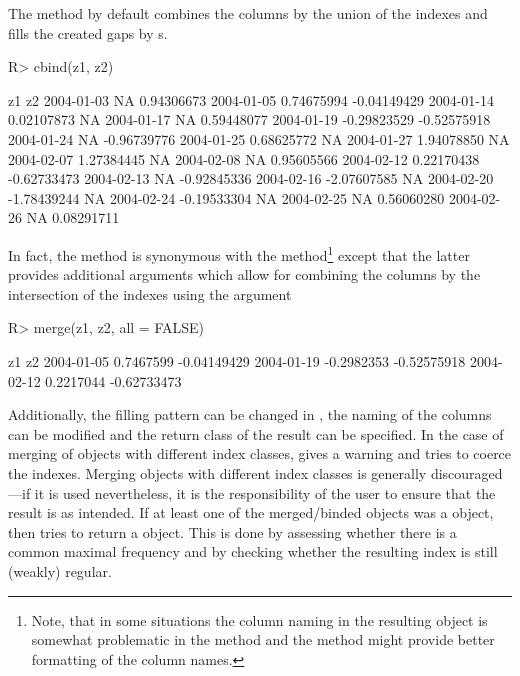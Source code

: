 \documentclass[article,nojss]{jss}
\begin{document}
The  method by default combines the columns by the union of
the indexes and fills the created gaps by s.
\begin{Schunk}
\begin{Sinput}
R> cbind(z1, z2)
\end{Sinput}
\begin{Soutput}
                    z1          z2
2004-01-03          NA  0.94306673
2004-01-05  0.74675994 -0.04149429
2004-01-14  0.02107873          NA
2004-01-17          NA  0.59448077
2004-01-19 -0.29823529 -0.52575918
2004-01-24          NA -0.96739776
2004-01-25  0.68625772          NA
2004-01-27  1.94078850          NA
2004-02-07  1.27384445          NA
2004-02-08          NA  0.95605566
2004-02-12  0.22170438 -0.62733473
2004-02-13          NA -0.92845336
2004-02-16 -2.07607585          NA
2004-02-20 -1.78439244          NA
2004-02-24 -0.19533304          NA
2004-02-25          NA  0.56060280
2004-02-26          NA  0.08291711
\end{Soutput}
\end{Schunk}
In fact, the  method is synonymous with the 
method\footnote{Note, that in some situations the column naming in the
resulting object is somewhat problematic in the  method
and the  method might provide better formatting of the
column names.}
except that the latter provides additional arguments
which allow for combining the columns by the intersection
of the indexes using the argument 
\begin{Schunk}
\begin{Sinput}
R> merge(z1, z2, all = FALSE)
\end{Sinput}
\begin{Soutput}
                   z1          z2
2004-01-05  0.7467599 -0.04149429
2004-01-19 -0.2982353 -0.52575918
2004-02-12  0.2217044 -0.62733473
\end{Soutput}
\end{Schunk}
Additionally, the filling pattern can be changed in ,
the naming of the
columns can be modified and the return class of the result can
be specified. In the case of merging of objects with 
different index classes,  gives a warning and tries to
coerce the indexes. Merging objects with different index classes is
generally discouraged---if it is used nevertheless, it is the
responsibility of the user to ensure that the result is as intended.
If at least one of the merged/binded objects was a  
object, then  tries to return a 
object. This is done by assessing whether there is a common maximal 
frequency and by checking whether the resulting index is still
(weakly) regular.
\end{document}
